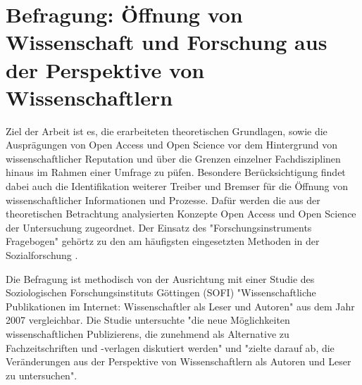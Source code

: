 \chapter{Befragung: Öffnung von Wissenschaft und Forschung aus der Perspektive von Wissenschaftlern}

Ziel der Arbeit ist es, die erarbeiteten theoretischen Grundlagen, sowie die Ausprägungen von Open Access und Open Science vor dem Hintergrund von wissenschaftlicher Reputation und über die Grenzen einzelner Fachdisziplinen hinaus im Rahmen einer Umfrage zu püfen. Besondere Berücksichtigung findet dabei auch die Identifikation weiterer Treiber und Bremser für die Öffnung von wissenschaftlicher Informationen und Prozesse. Dafür werden die aus der theoretischen Betrachtung analysierten Konzepte Open Access und Open Science der Untersuchung zugeordnet. Der Einsatz des "Forschungsinstruments Fragebogen" gehörtz zu den am häufigsten eingesetzten Methoden in der Sozialforschung \cite{raab_2012_fragebogen}.

Die Befragung ist methodisch von der Ausrichtung mit einer Studie des Soziologischen Forschungsinstituts Göttingen (SOFI) "Wissenschaftliche Publikationen im Internet: Wissenschaftler als Leser und Autoren" aus dem Jahr 2007 vergleichbar. Die Studie untersuchte "die neue Möglichkeiten wissenschaftlichen Publizierens, die zunehmend als Alternative zu Fachzeitschriften und -verlagen diskutiert werden" und "zielte darauf ab, die Veränderungen aus der Perspektive von Wissenschaftlern als Autoren und Leser zu untersuchen"\cite{SOFI_Webseite}. 

